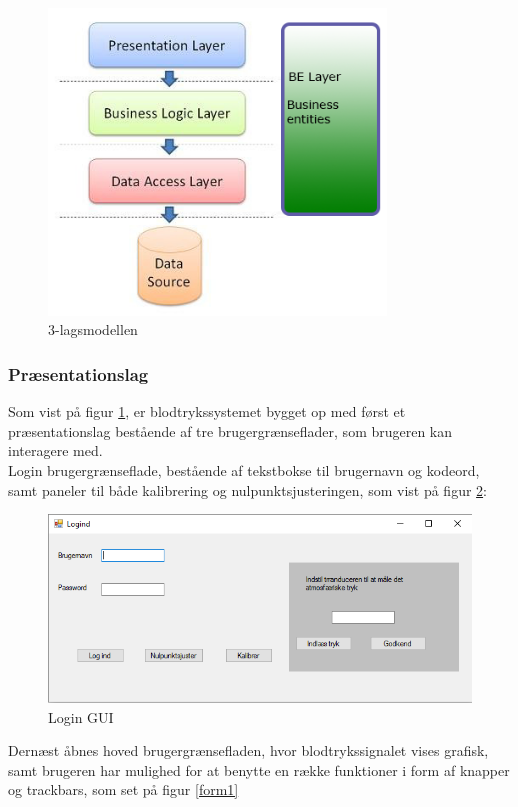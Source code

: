 \begin{figure}[H]
	\centering
	\includegraphics[width=0.8\textwidth]{Figurer/SoftwareImplementering/3lag}
	\caption{3-lagsmodellen}
	\label{3lag}
\end{figure}

\subsubsection{Præsentationslag}\label{praesentationslag}

Som vist på figur \ref{3lag}, er blodtrykssystemet bygget op med først et præsentationslag bestående af tre brugergrænseflader, som brugeren kan interagere med.\\
Login brugergrænseflade, bestående af tekstbokse til brugernavn og kodeord, samt paneler til både kalibrering og nulpunktsjusteringen, som vist på figur \ref{LoginGUI}:

\begin{figure}[H]
	\centering
	\includegraphics[width=1\textwidth]{Figurer/SoftwareImplementering/Logind}
	\caption{Login GUI}
	\label{LoginGUI}
\end{figure}
Dernæst åbnes hoved brugergrænsefladen, hvor blodtrykssignalet vises grafisk, samt brugeren har mulighed for at benytte en række funktioner i form af knapper og trackbars, som set på figur \ref{form1}

